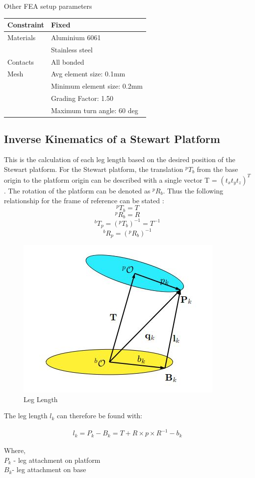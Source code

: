 \begin{center}
\begin{table}[!h]
\caption[FEA Setup]{Other FEA setup parameters}
\centering
\end{table}
\begin{tabular}{|l|l|}
\hline
Constraint & Fixed\\
\hline
Materials & Aluminium 6061\\
 & Stainless steel\\
\hline
Contacts & All bonded\\
\hline
Mesh& Avg element size: 0.1mm\\
& Minimum element size: 0.2mm\\
& Grading Factor: 1.50\\
& Maximum turn angle: 60 deg\\
\hline
\end{tabular}
\end{center}
\subsection{Inverse Kinematics of a Stewart Platform}
This is the calculation of each leg length based on the desired position of the Stewart platform. 
For the Stewart platform, the translation $^{p}T_{b}$ from the base origin to the platform origin can be described with a single vector T = $(t_{x} t_{y} t_{z})^{T} $. The rotation of the platform can be denoted as $^{p}R_{b}$. Thus the following relationship for the frame of reference can be stated \cite{Eisele_2019}:
$$^{p}T_{b} = T$$
	$$^{p}R_{b} = R$$
	$$^{b}T_{p} =(^{p}T_{b})^{-1} =T^{-1}$$
	$$^{b}R_{p} = (^{p}R_{b})^{-1} $$
\begin{center}
	\begin{figure}[!h]
	\centering
	\includegraphics[width=0.4\linewidth]{Figures/servo2}
	\caption[Leg length]{Leg Length \cite{Eisele_2019}}
	\end{figure}
\end{center}
The leg length $l_{k}$ can therefore be found with:
\begin{ceqn}
\begin{align}
	l_{k} = P_{k} - B_{k} = T + R \times p \times R^{-1} - b_{k}
\end{align}
\end{ceqn}
Where,\\
$P_{k}$ - leg attachment on platform \\
$B_{k}$- leg attachment on base 
